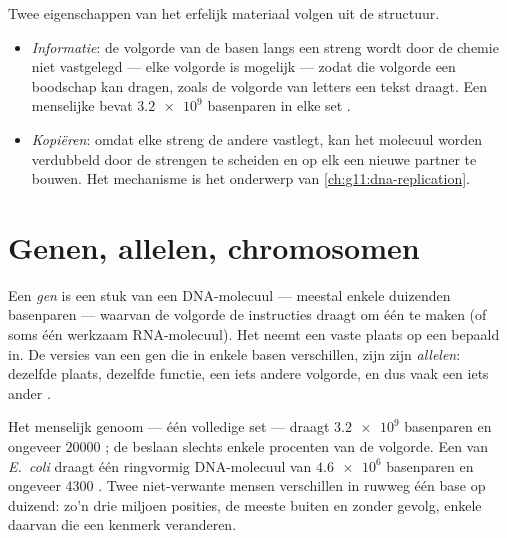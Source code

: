 \begin{proposition}\label{prop:g10:universal-dna:explains}
Twee eigenschappen van het erfelijk materiaal volgen uit de structuur.
\begin{itemize}
  \item \emph{Informatie}: de volgorde van de basen langs een streng
        wordt door de chemie niet vastgelegd --- elke volgorde is
        mogelijk --- zodat die volgorde een boodschap kan dragen, zoals
        de volgorde van letters een tekst draagt. Een menselijke 
        bevat $\num{3.2e9}$ basenparen in elke set .
  \item \emph{Kopiëren}: omdat elke streng de andere vastlegt, kan het
        molecuul worden verdubbeld door de strengen te scheiden en op
        elk een nieuwe partner te bouwen. Het mechanisme is het
        onderwerp van \cref{ch:g11:dna-replication}.
\end{itemize}
\end{proposition}
\admitted

\section{Genen, allelen, chromosomen}

\begin{definition}\label{def:g10:universal-dna:gene}
Een \emph{gen} is een stuk van een DNA-molecuul --- meestal
enkele duizenden basenparen --- waarvan de volgorde de instructies
draagt om één  te maken (of soms één werkzaam RNA-molecuul). Het
neemt een vaste plaats op een bepaald  in. De versies van een
gen die in enkele basen verschillen, zijn zijn
\emph{allelen}: dezelfde plaats, dezelfde functie, een
iets andere volgorde, en dus vaak een iets ander .
\end{definition}

\begin{example}[Getallen]\label{ex:g10:universal-dna:numbers}
Het menselijk genoom --- één volledige set  --- draagt
$\num{3.2e9}$ basenparen en ongeveer $\num{20000}$ ; de 
beslaan slechts enkele procenten van de volgorde. Een  van
\emph{E.~coli} draagt één ringvormig DNA-molecuul van $\num{4.6e6}$
basenparen en ongeveer 4300 . Twee niet-verwante mensen verschillen
in ruwweg één base op duizend: zo'n drie miljoen posities, de meeste
buiten  en zonder gevolg, enkele daarvan  die een kenmerk
veranderen.
\end{example}

